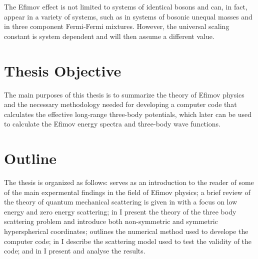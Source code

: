 The Efimov effect is not limited to systems of identical bosons and can, in fact, appear in a variety of systems, such as in systems of bosonic unequal masses and in three component Fermi-Fermi mixtures. However, the universal scaling constant is system dependent and will then assume a different value. 

\section{Thesis Objective}
The main purposes of this thesis is to summarize the theory of Efimov physics and the necessary methodology needed for developing a computer code that calculates the effective long-range three-body potentials, which later can be used to calculate the Efimov energy spectra and three-body wave functions. 

\section{Outline}
The thesis is organized as follows:  serves as an introduction to the reader of some of the main expermental findings in the field of Efimov physics; a brief review of the theory of quantum mechanical scattering is given in  with a focus on low energy and zero energy scattering; in  I present the theory of the three body scattering problem and introduce both non-symmetric and symmetric hyperspherical coordinates;  outlines the numerical method used to develope the computer code; in  I describe the scattering model used to test the validity of the code; and in  I present and analyse the results.
